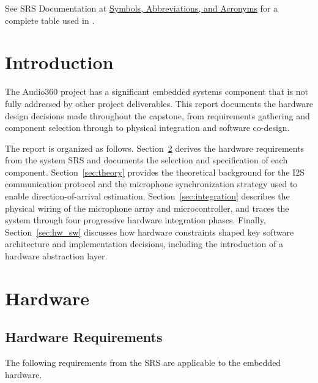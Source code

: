 \documentclass[12pt, titlepage]{article}
\begin{document}
See SRS Documentation at
\hyperref[SRS-sec:symbols]{Symbols, Abbreviations, and Acronyms}
for a complete table used in \progname.

\newpage

\tableofcontents

\listoftables

\listoffigures

\newpage


\section{Introduction}
The Audio360 project has a significant embedded systems component that is not
fully addressed by other project deliverables. This report documents the
hardware design decisions made throughout the capstone, from requirements
gathering and component selection through to physical integration and software
co-design.
\bigskip

The report is organized as follows. Section~\ref{sec:hardware} derives the
hardware requirements from the system SRS and documents the selection and
specification of each component. Section~\ref{sec:theory} provides the
theoretical background for the I2S communication protocol and the microphone
synchronization strategy used to enable direction-of-arrival estimation.
Section~\ref{sec:integration} describes the physical wiring of the microphone
array and microcontroller, and traces the system through four progressive
hardware integration phases. Finally, Section~\ref{sec:hw_sw} discusses how
hardware constraints shaped key software architecture and implementation
decisions, including the introduction of a hardware abstraction layer.


\section{Hardware}
\label{sec:hardware}

\subsection{Hardware Requirements}
The following requirements from the SRS are applicable to the embedded hardware.
\end{document}
